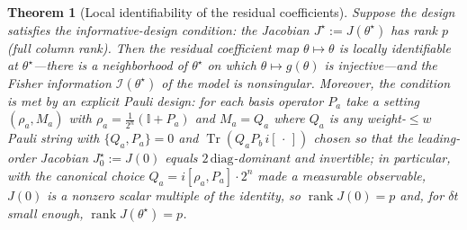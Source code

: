 \documentclass[aps,prxquantum,reprint,superscriptaddress,nofootinbib,amsmath,amssymb]{revtex4-2}
\newcommand{\Tr}{\operatorname{Tr}}
\newcommand{\id}{\mathbb{I}}
\newcommand{\dt}{\delta t}
\newtheorem{theorem}{Theorem}
\begin{document}
\begin{theorem}[Local identifiability of the residual coefficients]
\label{thm:identifiability}
Suppose the design satisfies the \emph{informative-design} condition: the Jacobian $J^\star:=J(\theta^\star)$ has rank $p$ (full column rank). Then the residual coefficient map $\theta\mapsto\theta$ is locally identifiable at $\theta^\star$---there is a neighborhood of $\theta^\star$ on which $\theta\mapsto g(\theta)$ is injective---and the Fisher information $\mathcal{I}(\theta^\star)$ of the model is nonsingular. Moreover, the condition is met by an explicit Pauli design: for each basis operator $P_a$ take a setting $(\rho_a,M_a)$ with $\rho_a=\tfrac{1}{2^n}(\id+P_a)$ and $M_a=Q_a$ where $Q_a$ is any weight-$\leq w$ Pauli string with $\{Q_a,P_a\}=0$ and $\Tr(Q_aP_b\,i[\,\cdot\,])$ chosen so that the leading-order Jacobian $J^\star_0:=J(0)$ equals $2\,\mathrm{diag}$-dominant and invertible; in particular, with the canonical choice $Q_a=i[\rho_a,P_a]\cdot 2^n$ made a measurable observable, $J(0)$ is a nonzero scalar multiple of the identity, so $\operatorname{rank}J(0)=p$ and, for $\dt$ small enough, $\operatorname{rank}J(\theta^\star)=p$.
\end{theorem}
\end{document}
